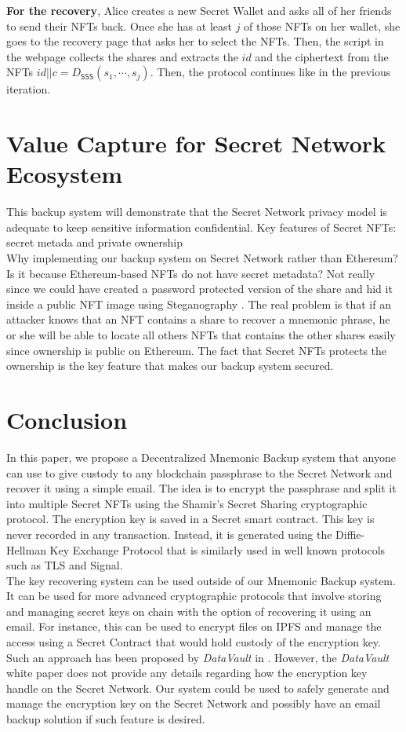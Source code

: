 \documentclass[12pt]{article}
\newcommand{\ms}[1]{\ensuremath{\mathsf{#1}}}
\begin{document}
{\bf For the recovery}, Alice creates a new Secret Wallet and asks all of her friends to send their NFTs back. Once she has at least $j$ of those NFTs on her wallet, she goes to the recovery page that asks her to select the NFTs. Then, the script in the webpage collects the shares and extracts the $id$ and the ciphertext from the NFTs $id||c = D_{\ms{SSS}}(s_1,\cdots,s_j)$. Then, the protocol continues like in the previous iteration. 

\section{Value Capture for Secret Network Ecosystem}

This backup system will demonstrate that the Secret Network privacy model is adequate to keep sensitive information confidential. Key features of Secret NFTs: secret metada and private ownership \\ 

Why implementing our backup system on Secret Network rather than Ethereum? Is it because Ethereum-based NFTs do not have secret metadata? Not really since we could have created a password protected version of the share and hid it inside a public NFT image using Steganography \cite{Steganography}. The real problem is that if an attacker knows that an NFT contains a share to recover a mnemonic phrase, he or she will be able to locate all others NFTs that contains the other shares easily since ownership is public on Ethereum. The fact that Secret NFTs protects the ownership is the key feature that makes our backup system secured. 

\section{Conclusion}

In this paper, we propose a Decentralized Mnemonic Backup system that anyone can use to give custody to any blockchain passphrase to the Secret Network \cite{SecretNetwork} and recover it using a simple email. The idea is to encrypt the passphrase and split it into multiple Secret NFTs using the Shamir's Secret Sharing cryptographic protocol. The encryption key is saved in a Secret smart contract. This key is never recorded in any transaction. Instead, it is generated using the Diffie-Hellman Key Exchange Protocol that is similarly used in well known protocols such as TLS and Signal. \\

The key recovering system can be used outside of our Mnemonic Backup system. It can be used for more advanced cryptographic protocols that involve storing and managing secret keys on chain with the option of recovering it using an email. For instance, this can be used to encrypt files on IPFS and manage the access using a Secret Contract that would hold custody of the encryption key. Such an approach has been proposed by {\em DataVault} in \cite{DataVault}. However, the {\em DataVault} white paper does not provide any details regarding how the encryption key handle on the Secret Network. Our system could be used to safely generate and manage the encryption key on the Secret Network and possibly have an email backup solution if such feature is desired.  
\end{document}

